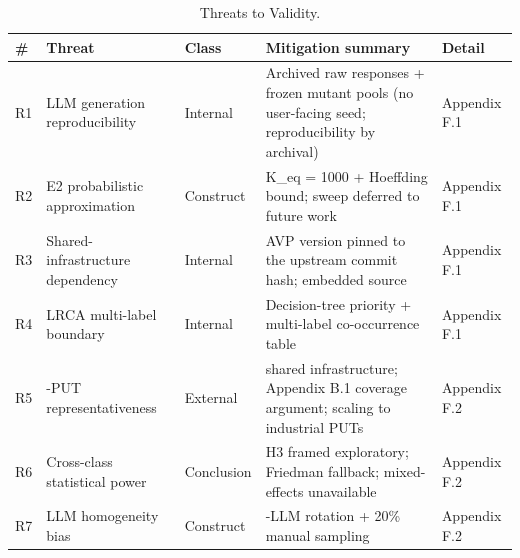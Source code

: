 \documentclass[manuscript,screen,review]{acmart}
\begin{document}
{%
\begin{longtable}[]{@{}
  >{\raggedright\arraybackslash}p{}
  >{\raggedright\arraybackslash}p{}
  >{\raggedright\arraybackslash}p{}
  >{\raggedright\arraybackslash}p{}
  >{\raggedright\arraybackslash}p{}@{}}
\caption{Threats to Validity.}\label{tab:p2-14}\\
\toprule\noalign{}
\begin{minipage}[b]{\linewidth}\raggedright
\#
\end{minipage} & \begin{minipage}[b]{\linewidth}\raggedright
Threat
\end{minipage} & \begin{minipage}[b]{\linewidth}\raggedright
Class
\end{minipage} & \begin{minipage}[b]{\linewidth}\raggedright
Mitigation summary
\end{minipage} & \begin{minipage}[b]{\linewidth}\raggedright
Detail
\end{minipage} \\
\midrule\noalign{}
\endfirsthead
\endhead
\bottomrule\noalign{}
\endlastfoot
R1 & LLM generation reproducibility & Internal & Archived raw responses
+ frozen mutant pools (no user-facing seed; reproducibility by archival) & Appendix F.1 \\
R2 & E2 probabilistic approximation & Construct & K\_eq = 1000 +
Hoeffding bound; sweep deferred to future work & Appendix F.1 \\
R3 & Shared-infrastructure dependency & Internal & AVP version pinned to the upstream
commit hash; embedded source & Appendix F.1 \\
R4 & LRCA multi-label boundary & Internal & Decision-tree priority +
multi-label co-occurrence table & Appendix F.1 \\
R5 & 12-PUT representativeness & External & shared infrastructure; Appendix B.1
coverage argument; scaling to industrial PUTs & Appendix F.2 \\
R6 & Cross-class statistical power & Conclusion & H3 framed exploratory;
Friedman fallback; mixed-effects unavailable & Appendix F.2 \\
R7 & LLM homogeneity bias & Construct & 3-LLM rotation + 20\% manual
sampling & Appendix F.2 \\

\end{longtable}}
\end{document}
